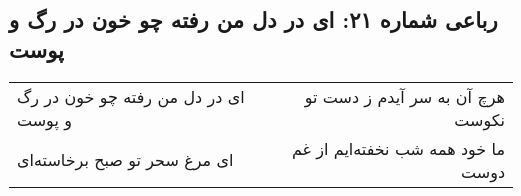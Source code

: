 \begin{center}
\section*{رباعی شماره ۲۱: ای در دل من رفته چو خون در رگ و پوست}
\label{sec:021}
\begin{longtable}{l p{0.5cm} r}
ای در دل من رفته چو خون در رگ و پوست
&&
هرچ آن به سر آیدم ز دست تو نکوست
\\
ای مرغ سحر تو صبح برخاسته‌ای
&&
ما خود همه شب نخفته‌ایم از غم دوست
\\
\end{longtable}
\end{center}
